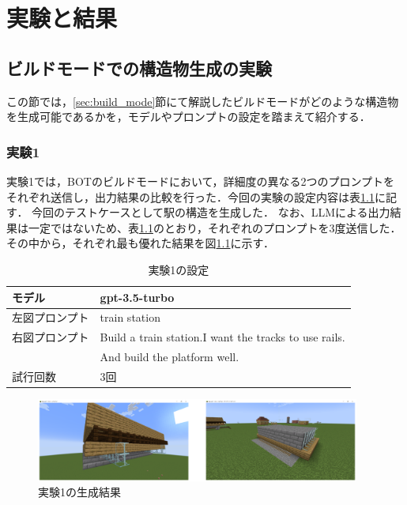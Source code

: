 \chapter{実験と結果}	%
\thispagestyle{plain}   %

\section{ビルドモードでの構造物生成の実験}\label{sec:build_mode_generate}
この節では，\ref{sec:build_mode}節にて解説したビルドモードがどのような構造物を生成可能であるかを，モデルやプロンプトの設定を踏まえて紹介する．

\subsection{実験1}\label{sec:ex1}
実験1では，BOTのビルドモードにおいて，詳細度の異なる2つのプロンプトをそれぞれ送信し，出力結果の比較を行った．今回の実験の設定内容は表\ref{tab:setting1}に記す．
今回のテストケースとして駅の構造を生成した．
なお、LLMによる出力結果は一定ではないため、表\ref{tab:setting1}のとおり，それぞれのプロンプトを3度送信した．
その中から，それぞれ最も優れた結果を図\ref{fig:station1}に示す．
\begin{table}[H]
    \caption{実験1の設定}\label{tab:setting1}
    \centering
    \begin{tabular}{ll}
        \hline \hline
        モデル & gpt-3.5-turbo \\
        \hline
        左図プロンプト & train station \\
        \hline
        右図プロンプト & Build a train station.I want the tracks to use rails. \\
        　 & And build the platform well. \\
        \hline
        試行回数 & 3回 \\
        \hline
    \end{tabular}
\end{table}

\begin{figure}[H]
    \centering
    \includegraphics[width=0.95\textwidth]{fig/train_station1.PNG}
    \caption{実験1の生成結果}
    \label{fig:station1}
\end{figure}

